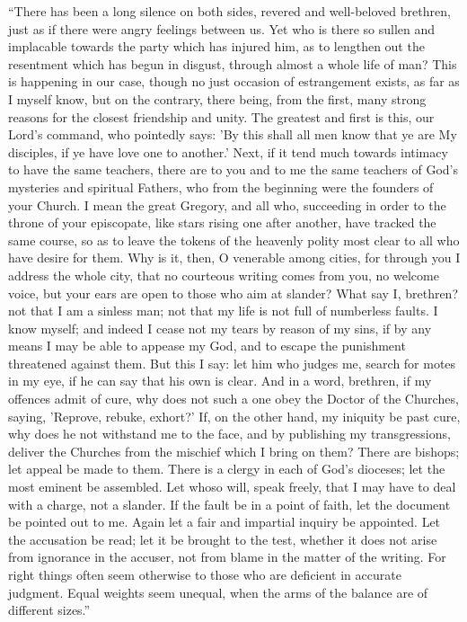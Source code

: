 ``There has been a long silence on both sides, revered and
well-beloved brethren, just as if there were angry feelings between
us. Yet who is there so sullen and implacable towards the party which
has injured him, as to lengthen out the resentment which has begun in
disgust, through almost a whole life of man? This is happening in our
case, though no just occasion of estrangement exists, as far as I
myself know, but on the contrary, there being, from the first, many
strong reasons for the closest friendship and unity. The greatest and
first is this, our Lord's command, who pointedly says: 'By this shall
all men know that ye are My disciples, if ye have love one to
another.' Next, if it tend much towards intimacy to have the same
teachers, there are to you and to me the same teachers of God's
mysteries and spiritual Fathers, who from the beginning were the
founders of your Church. I mean the great Gregory, and all who,
succeeding in order to the throne of your episcopate, like stars
rising one after another, have tracked the same course, so as to leave
the tokens of the heavenly polity most clear to all who have desire
for them. Why is it, then, O venerable among cities, for through you I
address the whole city, that no courteous writing comes from you, no
welcome voice, but your ears are open to those who aim at slander?
What say I, brethren? not that I am a sinless man; not that my life is
not full of numberless faults. I know myself; and indeed I cease not
my tears by reason of my sins, if by any means I may be able to
appease my God, and to escape the punishment threatened against them.
But this I say: let him who judges me, search for motes in my eye, if
he can say that his own is clear. And in a word, brethren, if my
offences admit of cure, why does not such a one obey the Doctor of the
Churches, saying, 'Reprove, rebuke, exhort?' If, on the other hand, my
iniquity be past cure, why does he not withstand me to the face, and
by publishing my transgressions, deliver the Churches
from the mischief which I bring on them? There are bishops; let appeal
be made to them. There is a clergy in each of God's dioceses; let the
most eminent be assembled. Let whoso will, speak freely, that I may
have to deal with a charge, not a slander. If the fault be in a point
of faith, let the document be pointed out to me. Again let a fair and
impartial inquiry be appointed. Let the accusation be read; let it be
brought to the test, whether it does not arise from ignorance in the
accuser, not from blame in the matter of the writing. For right things
often seem otherwise to those who are deficient in accurate judgment.
Equal weights seem unequal, when the arms of the balance are of
different sizes.''

